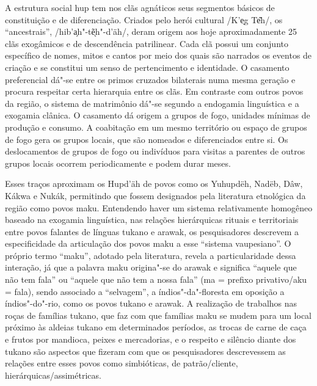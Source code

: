 A estrutura social hup tem nos clãs agnáticos seus segmentos básicos de
constituição e de diferenciação. Criados pelo herói cultural /K'e̖g Te͂h/,
os ``ancestrais'', /hib'a̗h"-tẽ̖h"-d'äh/, deram origem aos hoje
aproximadamente 25 clãs exogâmicos e de descendência patrilinear. Cada
clã possui um conjunto específico de nomes, mitos e cantos por meio dos
quais são narrados os eventos de criação e se constitui um senso de
pertencimento e identidade. O casamento preferencial dá"-se entre os
primos cruzados bilaterais numa mesma geração e procura respeitar certa
hierarquia entre os clãs. Em contraste com outros povos da região, o
sistema de matrimônio dá"-se segundo a endogamia linguística e a exogamia
clânica. O casamento dá origem a grupos de fogo, unidades mínimas de
produção e consumo. A coabitação em um mesmo território ou espaço de
grupos de fogo gera os grupos locais, que são nomeados e diferenciados
entre si. Os deslocamentos de grupos de fogo ou indivíduos para visitas
a parentes de outros grupos locais ocorrem periodicamente e podem durar
meses.

Esses traços aproximam os Hupd'äh de povos como os Yuhupdëh, Nadëb, Dâw,
Kákwa e Nukák, permitindo que fossem designados pela literatura
etnológica da região como povos maku. Entendendo haver um sistema
relativamente homogêneo baseado na exogamia linguística, nas relações
hierárquicas rituais e territoriais entre povos falantes de línguas
tukano e arawak, os pesquisadores descrevem a especificidade da
articulação dos povos maku a esse ``sistema vaupesiano''. O próprio
termo ``maku'', adotado pela literatura, revela a particularidade dessa
interação, já que a palavra maku origina"-se do arawak e significa
``aquele que não tem fala'' ou ``aquele que não tem a nossa fala'' (ma =
prefixo privativo/aku = fala), sendo associado a ``selvagem'', a
índios"-da"-floresta em oposição a índios"-do"-rio, como os povos tukano e
arawak. A realização de trabalhos nas roças de famílias tukano, que faz
com que famílias maku se mudem para um local próximo às aldeias tukano
em determinados períodos, as trocas de carne de caça e frutos por
mandioca, peixes e mercadorias, e o respeito e silêncio diante dos
tukano são aspectos que fizeram com que os pesquisadores descrevessem as
relações entre esses povos como simbióticas, de patrão/cliente,
hierárquicas/assimétricas.

